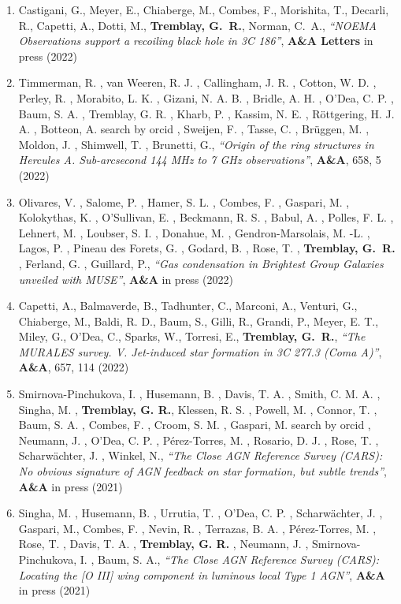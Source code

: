\documentclass[11pt]{article}
\begin{document}
\begin{enumerate}[resume]

\item Castigani, G., Meyer, E., Chiaberge, M., Combes, F., Morishita, T., Decarli, R., Capetti, A., Dotti, M., \textbf{Tremblay, G.~R.}, Norman, C.~A., \textit{``NOEMA Observations support a recoiling black hole in 3C 186''}, \textbf{A\&A Letters} in press (2022)

\item Timmerman, R. , van Weeren, R. J. , Callingham, J. R. , Cotton, W. D. , Perley, R. , Morabito, L. K. , Gizani, N. A. B. , Bridle, A. H. , O'Dea, C. P. , Baum, S. A. , Tremblay, G. R. , Kharb, P. , Kassim, N. E. , Röttgering, H. J. A. , Botteon, A. search by orcid , Sweijen, F. , Tasse, C. , Br\"{u}ggen, M. , Moldon, J. , Shimwell, T. , Brunetti, G., \textit{``Origin of the ring structures in Hercules A. Sub-arcsecond 144 MHz to 7 GHz observations''}, \textbf{A\&A}, 658, 5 (2022)

\item Olivares, V. , Salome, P. , Hamer, S. L. , Combes, F. , Gaspari, M. , Kolokythas, K. , O'Sullivan, E. , Beckmann, R. S. , Babul, A. , Polles, F. L. , Lehnert, M. , Loubser, S. I. , Donahue, M. , Gendron-Marsolais, M. -L. , Lagos, P. , Pineau des Forets, G. , Godard, B. , Rose, T. , \textbf{Tremblay, G.~R.} , Ferland, G. , Guillard, P., \textit{``Gas condensation in Brightest Group Galaxies unveiled with MUSE''}, \textbf{A\&A} in press (2022)

\item Capetti, A., Balmaverde, B., Tadhunter, C., Marconi, A., Venturi, G., Chiaberge, M., Baldi, R. D., Baum, S., Gilli, R., Grandi, P., Meyer, E. T., Miley, G., O'Dea, C., Sparks, W., Torresi, E., \textbf{Tremblay, G.~R.}, \textit{``The MURALES survey. V. Jet-induced star formation in 3C 277.3 (Coma A)''}, \textbf{A\&A}, 657, 114 (2022)

\item Smirnova-Pinchukova, I. , Husemann, B. , Davis, T. A. , Smith, C. M. A. , Singha, M. , \textbf{Tremblay, G. R.}, Klessen, R. S. , Powell, M. , Connor, T. , Baum, S. A. , Combes, F. , Croom, S. M. , Gaspari, M. search by orcid , Neumann, J. , O'Dea, C. P. , Pérez-Torres, M. , Rosario, D. J. , Rose, T. , Scharwächter, J. , Winkel, N., \textit{``The Close AGN Reference Survey (CARS): No obvious signature of AGN feedback on star formation, but subtle trends''}, \textbf{A\&A} in press (2021)

\item Singha, M. , Husemann, B. , Urrutia, T. , O'Dea, C. P. , Scharwächter, J. , Gaspari, M., Combes, F. , Nevin, R. , Terrazas, B. A. , Pérez-Torres, M. , Rose, T. , Davis, T. A. , \textbf{Tremblay, G. R.} , Neumann, J. , Smirnova-Pinchukova, I. , Baum, S. A., \textit{``The Close AGN Reference Survey (CARS): Locating the [O III] wing component in luminous local Type 1 AGN''}, \textbf{A\&A} in press (2021)


\end{enumerate}
\end{document}

